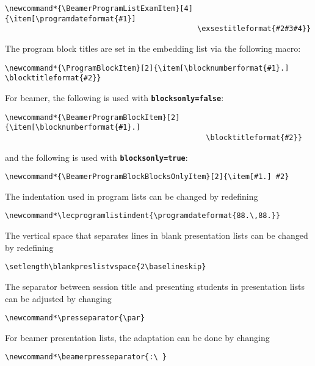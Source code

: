 \documentclass[english]{article}
\newcommand*\joption[1]{\textbf{\texttt{#1}}}
\begin{document}
\begin{lstlisting}[language={[LaTeX]TeX},basicstyle={\small\ttfamily},
frame=single,moretexcs={[3]{BeamerProgramListExamItem,programdateformat,exsestitleformat}}]
\newcommand*{\BeamerProgramListExamItem}[4]{\item[\programdateformat{#1}]
                                            \exsestitleformat{#2#3#4}}
\end{lstlisting}
%
The program block titles are set in the embedding list via the following macro:
\begin{lstlisting}[language={[LaTeX]TeX},basicstyle={\small\ttfamily},
frame=single,moretexcs={[3]{ProgramBlockItem,blocknumberformat,blocktitleformat}}]
\newcommand*{\ProgramBlockItem}[2]{\item[\blocknumberformat{#1}.] \blocktitleformat{#2}}
\end{lstlisting}
%
For beamer, the following is used with \joption{blocksonly=false}:
\begin{lstlisting}[language={[LaTeX]TeX},basicstyle={\small\ttfamily},
frame=single,moretexcs={[3]{BeamerProgramBlockItem,blocknumberformat,blocktitleformat}}]
\newcommand*{\BeamerProgramBlockItem}[2]{\item[\blocknumberformat{#1}.]
                                              \blocktitleformat{#2}}
\end{lstlisting}
%
and the following is used with \joption{blocksonly=true}:
\begin{lstlisting}[language={[LaTeX]TeX},basicstyle={\small\ttfamily},
frame=single,moretexcs={[1]{BeamerProgramBlockBlocksOnlyItem}}]
\newcommand*{\BeamerProgramBlockBlocksOnlyItem}[2]{\item[#1.] #2}
\end{lstlisting}
%
The indentation used in program lists can be changed by redefining
\begin{lstlisting}[language={[LaTeX]TeX},basicstyle={\small\ttfamily},frame=single,
moretexcs={[2]{lecprogramlistindent,programdateformat}}]
\newcommand*\lecprogramlistindent{\programdateformat{88.\,88.}}
\end{lstlisting}
%
The vertical space that separates lines in blank presentation lists can be changed
by redefining
\begin{lstlisting}[language={[LaTeX]TeX},basicstyle={\small\ttfamily},frame=single,
moretexcs={[2]{blankpreslistvspace,setlength}}]
\setlength\blankpreslistvspace{2\baselineskip}
\end{lstlisting}
%
The separator between session title and presenting students in presentation lists
can be adjusted by changing
\begin{lstlisting}[language={[LaTeX]TeX},basicstyle={\small\ttfamily},frame=single,
moretexcs={[1]{presseparator}}]
\newcommand*\presseparator{\par}
\end{lstlisting}
%
For beamer presentation lists, the adaptation can be done by changing
\begin{lstlisting}[language={[LaTeX]TeX},basicstyle={\small\ttfamily},frame=single,
moretexcs={[1]{beamerpresseparator}}]
\newcommand*\beamerpresseparator{:\ }
\end{lstlisting}
\end{document}
